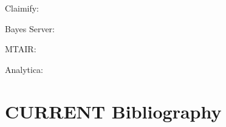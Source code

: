 \documentclass[
  11pt,
  letterpaper,
]{book}
\begin{document}
\textcite{hadshar2023}

\textcite{kasirzadeh2024}

\textcite{sotala2018}

Claimify: \textcite{metropolitansky2025}

Bayes Server:

\textcite{bayes2025}

MTAIR:

\textcite{martin2023}

\textcite{manheim2021}

\textcite{riceissa2021}

\textcite{eth2021}

\textcite{martin2021}

\textcite{cottier2021}

\textcite{cottier2021}

\textcite{cottier2021b}

\textcite{davidmanheim2021a}

Analytica:

\textcite{lumina2025}


\chapter*{CURRENT Bibliography}\label{current-bibliography}

\end{document}

